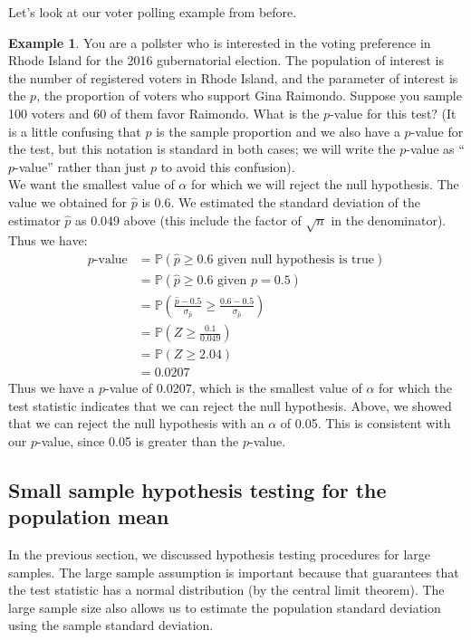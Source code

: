 \documentclass[12pt]{article}
\theoremstyle{definition}
\newtheorem*{example}{Example}
\theoremstyle{remark}
\def\P{{\mathbb P}}
\begin{document}
Let's look at our voter polling example from before.

\begin{example}
You are a pollster who is interested in the voting preference in Rhode Island for the 2016 gubernatorial election. The population of interest is the number of registered voters in Rhode Island, and the parameter of interest is the $p$, the proportion of voters who support Gina Raimondo. Suppose you sample 100 voters and 60 of them favor Raimondo. What is the $p$-value for this test? (It is a little confusing that $p$ is the sample proportion and we also have a $p$-value for the test, but this notation is standard in both cases; we will write the $p$-value as ``$p$-value'' rather than just $p$ to avoid this confusion).\\

We want the smallest value of $\alpha$ for which we will reject the null hypothesis. The value we obtained for $\hat{p}$ is 0.6. We estimated the standard deviation of the estimator $\hat{p}$ as 0.049 above (this include the factor of $\sqrt{n}$ in the denominator). Thus we have:
\begin{align*}
p\text{-value} &= \P(\hat{p} \geq 0.6 \text{ given null hypothesis is true})\\
&= \P(\hat{p} \geq 0.6 \text{ given } p = 0.5)\\
&= \P \left( \frac{\hat{p} - 0.5}{\sigma_{\hat{p}}} \geq \frac{0.6 - 0.5}{\sigma_{\hat{p}}} \right) \\
&= \P \left( Z \geq \frac{0.1}{0.049} \right)\\
&= \P (Z \geq 2.04)\\
&= 0.0207
\end{align*}
Thus we have a $p$-value of 0.0207, which is the smallest value of $\alpha$ for which the test statistic indicates that we can reject the null hypothesis. Above, we showed that we can reject the null hypothesis with an $\alpha$ of 0.05. This is consistent with our $p$-value, since 0.05 is greater than the $p$-value.
\end{example}

\subsection{Small sample hypothesis testing for the population mean}
In the previous section, we discussed hypothesis testing procedures for large samples. The large sample assumption is important because that guarantees that the test statistic has a normal distribution (by the central limit theorem). The large sample size also allows us to estimate the population standard deviation using the sample standard deviation.\\
\end{document}
